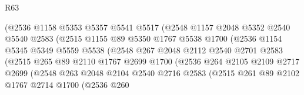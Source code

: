 \begin{lexlean}{R63}
\begin{coremodule}
                          (@2536
                            @1158
                            @5353
                            @5357
                            @5541
                            @5517
                            (@2548
                              @1157
                              @2048
                              @5352
                              @2540
                              @5540
                              @2583
                              (@2515
                                @1155
                                @89
                                @5350
                                @1767
                                @5538
                                @1700
                                (@2536
                                  @1154
                                  @5345
                                  @5349
                                  @5559
                                  @5538
                                  (@2548
                                    @267
                                    @2048
                                    @2112
                                    @2540
                                    @2701
                                    @2583
                                    (@2515
                                      @265
                                      @89
                                      @2110
                                      @1767
                                      @2699
                                      @1700
                                      (@2536
                                        @264
                                        @2105
                                        @2109
                                        @2717
                                        @2699
                                        (@2548
                                          @263
                                          @2048
                                          @2104
                                          @2540
                                          @2716
                                          @2583
                                          (@2515
                                            @261
                                            @89
                                            @2102
                                            @1767
                                            @2714
                                            @1700
                                            (@2536
                                              @260

\end{coremodule}
\end{lexlean}
